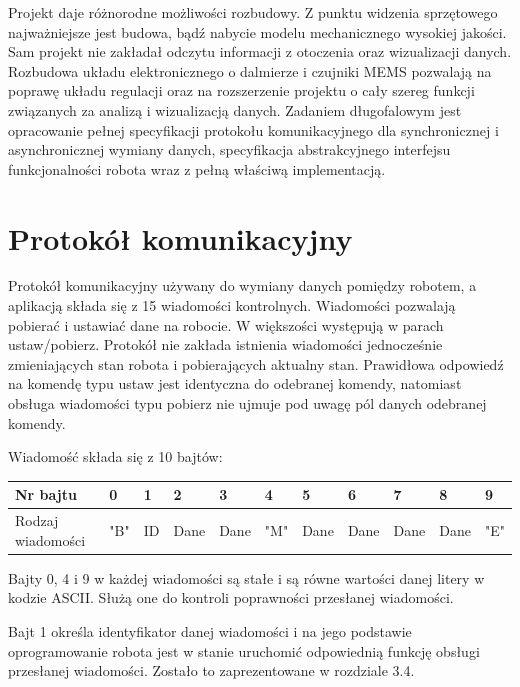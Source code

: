 \documentclass[eng,printmode]{mgr}
\begin{document}
Projekt daje różnorodne możliwości rozbudowy. Z punktu widzenia sprzętowego najważniejsze jest budowa, bądź nabycie modelu mechanicznego wysokiej jakości. Sam projekt nie zakładał odczytu informacji z otoczenia oraz wizualizacji danych. Rozbudowa układu elektronicznego o dalmierze i czujniki MEMS pozwalają na poprawę układu regulacji oraz na rozszerzenie projektu o cały szereg funkcji związanych za analizą i wizualizacją danych. Zadaniem długofalowym jest opracowanie pełnej specyfikacji protokołu komunikacyjnego dla synchronicznej i asynchronicznej wymiany danych, specyfikacja abstrakcyjnego interfejsu funkcjonalności robota wraz z pełną właściwą implementacją. 

\appendix 
\chapter{Protokół komunikacyjny}
Protokół komunikacyjny używany do wymiany danych pomiędzy robotem, a aplikacją składa się z 15 wiadomości kontrolnych. Wiadomości pozwalają  pobierać i ustawiać dane na robocie. W większości występują w parach ustaw/pobierz. Protokół nie zakłada istnienia wiadomości jednocześnie zmieniających stan robota i pobierających aktualny stan. Prawidłowa odpowiedź na komendę typu ustaw jest identyczna do odebranej komendy, natomiast obsługa wiadomości typu pobierz nie ujmuje pod uwagę pól danych odebranej komendy.

Wiadomość składa się z 10 bajtów:
\begin{table}[!htb]
\centering
\begin{adjustbox}{width=1\textwidth}
\label{my-label}
\begin{tabular}{|l|l|l|l|l|l|l|l|l|l|l|}
\hline
Nr bajtu          & 0   & 1  & 2    & 3    & 4   & 5    & 6    & 7    & 8    & 9   \\ \hline
Rodzaj wiadomości & "B" & ID & Dane & Dane & "M" & Dane & Dane & Dane & Dane & "E" \\ \hline
\end{tabular}
\end{adjustbox}
\end{table}

Bajty 0, 4 i 9 w każdej wiadomości  są stałe i są równe wartości danej litery w kodzie ASCII. Służą one do kontroli poprawności przesłanej wiadomości.

Bajt 1 określa identyfikator danej wiadomości i na jego podstawie oprogramowanie robota jest w stanie uruchomić odpowiednią funkcję obsługi przesłanej wiadomości. Zostało to zaprezentowane w rozdziale 3.4.
\end{document}
